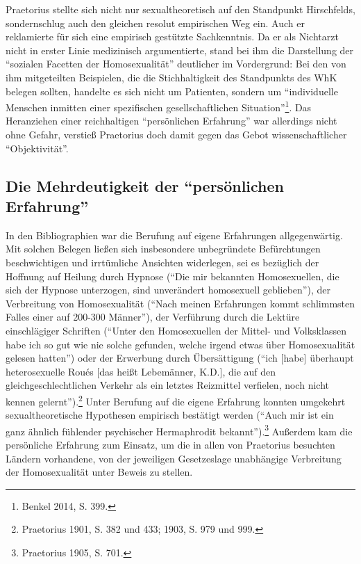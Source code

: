 \documentclass[a4paper,
fontsize=11pt,
oneside,
numbers=noperiodatend,
parskip=half-,
bibliography=totoc,
final
]{scrartcl}
\begin{document}
Praetorius stellte sich nicht nur sexualtheoretisch auf den Standpunkt
Hirschfelds, sondern\linebreak schlug auch den gleichen resolut empirischen Weg
ein. Auch er reklamierte für sich eine empirisch gestützte Sachkenntnis.
Da er als Nichtarzt nicht in erster Linie medizinisch argumentierte,
stand bei ihm die Darstellung der \enquote{sozialen Facetten der
Homosexualität} deutlicher im Vordergrund: Bei den von ihm mitgeteilten
Beispielen, die die Stichhaltigkeit des Standpunkts des WhK belegen
sollten, handelte es sich nicht um Patienten, sondern um
\enquote{individuelle Menschen inmitten einer spezifischen
gesellschaftlichen Situation}\footnote{Benkel 2014, S. 399.}. Das
Heranziehen einer reichhaltigen \enquote{persönlichen Erfahrung} war
allerdings nicht ohne Gefahr, verstieß Praetorius doch damit gegen das
Gebot wissenschaftlicher \enquote{Objektivität}.

\subsection*{\texorpdfstring{Die Mehrdeutigkeit der \enquote{persönlichen
Erfahrung}}{Die Mehrdeutigkeit der persönlichen Erfahrung}}\label{die-mehrdeutigkeit-der-persuxf6nlichen-erfahrung}

In den Bibliographien war die Berufung auf eigene Erfahrungen
allgegenwärtig. Mit solchen Belegen ließen sich insbesondere
unbegründete Befürchtungen beschwichtigen und irrtümliche Ansichten
widerlegen, sei es bezüglich der Hoffnung auf Heilung durch Hypnose
(\enquote{Die mir bekannten Homosexuellen, die sich der Hypnose
unterzogen, sind unverändert homosexuell geblieben}), der Verbreitung
von Homosexualität (\enquote{Nach meinen Erfahrungen kommt schlimmsten
Falles einer auf 200-300 Männer}), der Verführung durch die Lektüre
einschlägiger Schriften (\enquote{Unter den Homosexuellen der Mittel-
und Volksklassen habe ich so gut wie nie solche gefunden, welche irgend
etwas über Homosexualität gelesen hatten}) oder der Erwerbung durch
Übersättigung (\enquote{ich {[}habe{]} überhaupt heterosexuelle Roués
{[}das heißt Lebemänner, K.D.{]}, die auf den gleichgeschlechtlichen
Verkehr als ein letztes Reizmittel verfielen, noch nicht kennen
gelernt}).\footnote{Praetorius 1901, S. 382 und 433; 1903, S. 979 und
  999.} Unter Berufung auf die eigene Erfahrung konnten umgekehrt
sexualtheoretische Hypothesen empirisch bestätigt werden (\enquote{Auch
mir ist ein ganz ähnlich fühlender psychischer Hermaphrodit
bekannt}).\footnote{Praetorius 1905, S. 701.} Außerdem kam die
persönliche Erfahrung zum Einsatz, um die in allen von Praetorius
besuchten Ländern vorhandene, von der jeweiligen Gesetzeslage
unabhängige Verbreitung der Homosexualität unter Beweis zu stellen.
\end{document}
